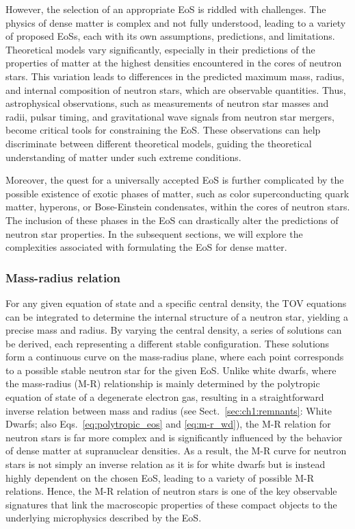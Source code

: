\documentclass[main.tex]{subfiles}
\begin{document}
    However, the selection of an appropriate EoS is riddled with challenges. The physics of dense matter is complex and not fully understood, leading to a variety of proposed EoSs, each with its own assumptions, predictions, and limitations. Theoretical models vary significantly, especially in their predictions of the properties of matter at the highest densities encountered in the cores of neutron stars. This variation leads to differences in the predicted maximum mass, radius, and internal composition of neutron stars, which are observable quantities. Thus, astrophysical observations, such as measurements of neutron star masses and radii, pulsar timing, and gravitational wave signals from neutron star mergers, become critical tools for constraining the EoS. These observations can help discriminate between different theoretical models, guiding the theoretical understanding of matter under such extreme conditions.
    
    Moreover, the quest for a universally accepted EoS is further complicated by the possible existence of exotic phases of matter, such as color superconducting quark matter, hyperons, or Bose-Einstein condensates, within the cores of neutron stars. The inclusion of these phases in the EoS can drastically alter the predictions of neutron star properties. In the subsequent sections, we will explore the complexities associated with formulating the EoS for dense matter.
    
    \subsubsection{Mass-radius relation}
    For any given equation of state and a specific central density, the TOV equations can be integrated to determine the internal structure of a neutron star, yielding a precise mass and radius. By varying the central density, a series of solutions can be derived, each representing a different stable configuration. These solutions form a continuous curve on the mass-radius plane, where each point corresponds to a possible stable neutron star for the given EoS. Unlike white dwarfs, where the mass-radius (M-R) relationship is mainly determined by the polytropic equation of state of a degenerate electron gas, resulting in a straightforward inverse relation between mass and radius (see Sect.~\ref{sec:ch1:remnants}: White Dwarfs; also Eqs.~\ref{eq:polytropic_eos} and \ref{eq:m-r_wd}), the M-R relation for neutron stars is far more complex and is significantly influenced by the behavior of dense matter at supranuclear densities. As a result, the M-R curve for neutron stars is not simply an inverse relation as it is for white dwarfs but is instead highly dependent on the chosen EoS, leading to a variety of possible M-R relations. Hence, the M-R relation of neutron stars is one of the key observable signatures that link the macroscopic properties of these compact objects to the underlying microphysics described by the EoS.
    
\end{document}
